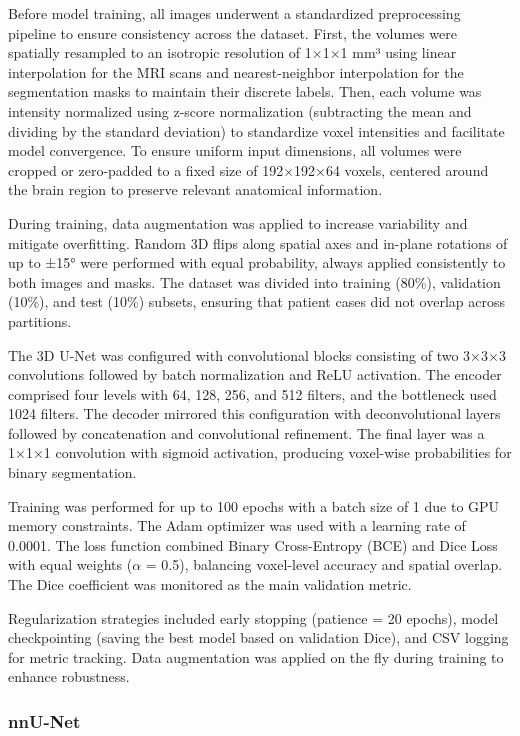 \documentclass[12pt]{article}
\begin{document}
Before model training, all images underwent a standardized preprocessing pipeline to ensure consistency across the dataset. First, the volumes were spatially resampled to an isotropic resolution of 1×1×1 mm³ using linear interpolation for the MRI scans and nearest-neighbor interpolation for the segmentation masks to maintain their discrete labels. Then, each volume was intensity normalized using z-score normalization (subtracting the mean and dividing by the standard deviation) to standardize voxel intensities and facilitate model convergence. To ensure uniform input dimensions, all volumes were cropped or zero-padded to a fixed size of 192×192×64 voxels, centered around the brain region to preserve relevant anatomical information.

During training, data augmentation was applied to increase variability and mitigate overfitting. Random 3D flips along spatial axes and in-plane rotations of up to ±15° were performed with equal probability, always applied consistently to both images and masks. The dataset was divided into training (80\%), validation (10\%), and test (10\%) subsets, ensuring that patient cases did not overlap across partitions.

The 3D U-Net was configured with convolutional blocks consisting of two 3×3×3 convolutions followed by batch normalization and ReLU activation. The encoder comprised four levels with 64, 128, 256, and 512 filters, and the bottleneck used 1024 filters. The decoder mirrored this configuration with deconvolutional layers followed by concatenation and convolutional refinement. The final layer was a 1×1×1 convolution with sigmoid activation, producing voxel-wise probabilities for binary segmentation.

Training was performed for up to 100 epochs with a batch size of 1 due to GPU memory constraints. The Adam optimizer was used with a learning rate of 0.0001. The loss function combined Binary Cross-Entropy (BCE) and Dice Loss with equal weights ($\alpha$ = 0.5), balancing voxel-level accuracy and spatial overlap. The Dice coefficient was monitored as the main validation metric.

Regularization strategies included early stopping (patience = 20 epochs), model checkpointing (saving the best model based on validation Dice), and CSV logging for metric tracking. Data augmentation was applied on the fly during training to enhance robustness.

\subsubsection{nnU-Net} \label{subsubsec:nnunet_arch}
\end{document}
